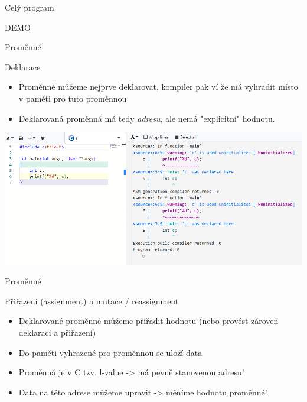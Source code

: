 \documentclass[9pt]{beamer}
\begin{document}
\begin{frame}{Celý program}
\begin{center}
    DEMO
\end{center}
\end{frame}

\begin{frame}{Proměnné}
    \begin{block}{Deklarace}
        \begin{itemize}
            \item Proměnné můžeme nejprve deklarovat, kompiler pak ví že má vyhradit místo v paměti pro tuto proměnnou
            \item Deklarovaná proměnná má tedy \textit{adresu}, ale nemá "explicitní" hodnotu.
        \end{itemize}
        \begin{center}
            \includegraphics[width=0.8\linewidth]{lekce19/unassigned.png}
        \end{center}
    \end{block}
\end{frame}

\begin{frame}{Proměnné}
    \begin{block}{Přiřazení (assignment) a mutace / reassignment}
        \begin{itemize}
            \item Deklarované proměnné můžeme přiřadit hodnotu (nebo provést zároveň deklaraci a přiřazení)
            \item Do paměti vyhrazené pro proměnnou se uloží data
            \item Proměnná je v C tzv. l-value -> má pevně stanovenou adresu!
            \item Data na této adrese můžeme upravit -> měníme hodnotu proměnné!
        \end{itemize}
    \end{block}
    
\end{frame}
\end{document}
